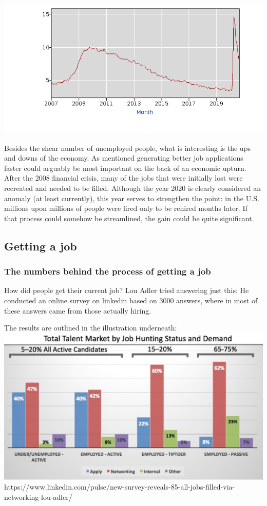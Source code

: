\includegraphics{figures/US_unemployment_rate}

Besides the shear number of unemployed people, what is interesting is the ups
and downs of the economy. As mentioned generating better job applications faster
could arguably be most important on the back of an economic upturn. After the
2008 financial crisis, many of the jobs that were initially lost were recreated
and needed to be filled. Although the year 2020 is clearly considered an anomaly
(at least currently), this year serves to strengthen the point: in the U.S.
millions upon millions of people were fired only to be rehired months later. If
that process could somehow be streamlined, the gain could be quite significant.

\subsection{Getting a job}

\subsubsection{The numbers behind the process of getting a job}
How did people get their current job?
Lou Adler tried answering just this: He conducted an online survey
on linkedin based on 3000 answers, where in most of these answers
came from those actually hiring.

The results are outlined in the illustration underneath:
\includegraphics{figures/hiringpeople.png}
https://www.linkedin.com/pulse/new-survey-reveals-85-all-jobs-filled-via-networking-lou-adler/

